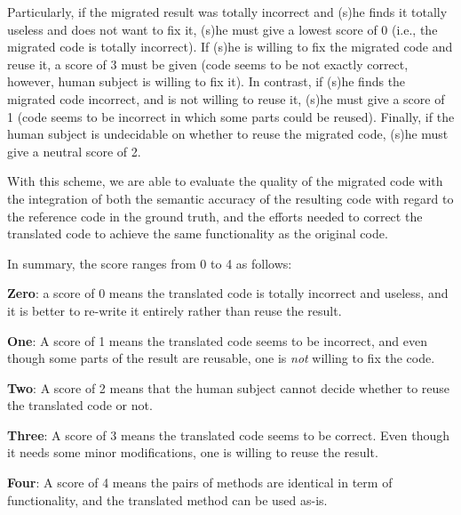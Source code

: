 %
Particularly, if the migrated result was totally incorrect and (s)he
finds it totally useless and does not want to fix it, (s)he must give
a lowest score of 0 (i.e., the migrated code is totally incorrect).
%
If (s)he is willing to fix the migrated code and reuse it, a score of
3 must be given (code seems to be not exactly correct, however, human
subject is willing to fix it). In contrast, if (s)he finds the
migrated code incorrect, and is not willing to reuse it, (s)he must
give a score of 1 (code seems to be incorrect in which some parts
could be reused). Finally, if the human subject is undecidable on
whether to reuse the migrated code, (s)he must give a neutral score of
2.

With this scheme, we are able to evaluate the quality of the migrated
code with the integration of both the semantic accuracy of the
resulting code with regard to the reference code in the ground truth,
and the efforts needed to correct the translated code to achieve the
same functionality as the original code.


%

In summary, the score ranges from 0 to 4 as follows:

\begin{compactitem}

\item {\bf Zero}: a score of 0 means the translated code is totally
  incorrect and useless, and it is better to re-write it entirely
  rather than reuse the result.

\item {\bf One}: A score of 1 means the translated code seems to be
  incorrect, and even though some parts of the result are reusable,
  one is {\em not} willing to fix the code.

\item {\bf Two}: A score of 2 means that the human subject cannot
  decide whether to reuse the translated code or not.

\item {\bf Three}: A score of 3 means the translated code seems to be
  correct. Even though it needs some minor modifications, one is
  willing to reuse the result.

\item {\bf Four}: A score of 4 means the pairs of methods are
  identical in term of functionality, and the translated method can be
  used as-is.

\end{compactitem}

